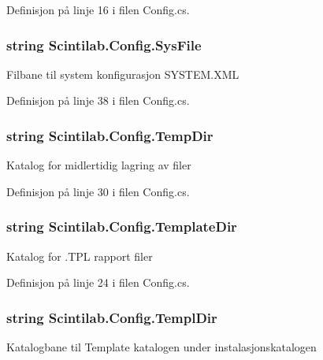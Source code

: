 Definisjon på linje 16 i filen Config.\+cs.

\hypertarget{class_scintilab_1_1_config_a08bd32b13d26a35e5888aa530b757fd8}{
\subsubsection[{Sys\+File}]{\setlength{\rightskip}{0pt plus 5cm}string Scintilab.\+Config.\+Sys\+File\hspace{0.3cm}{\ttfamily [static]}}}\label{class_scintilab_1_1_config_a08bd32b13d26a35e5888aa530b757fd8}
Filbane til system konfigurasjon S\+Y\+S\+T\+E\+M.\+X\+M\+L 

Definisjon på linje 38 i filen Config.\+cs.

\hypertarget{class_scintilab_1_1_config_a2cd246ee28cb2fbf3b3664e2de4e4a2f}{
\subsubsection[{Temp\+Dir}]{\setlength{\rightskip}{0pt plus 5cm}string Scintilab.\+Config.\+Temp\+Dir\hspace{0.3cm}{\ttfamily [static]}}}\label{class_scintilab_1_1_config_a2cd246ee28cb2fbf3b3664e2de4e4a2f}
Katalog for midlertidig lagring av filer 

Definisjon på linje 30 i filen Config.\+cs.

\hypertarget{class_scintilab_1_1_config_a281e06e21224c52ea875ca48a91285ac}{
\subsubsection[{Template\+Dir}]{\setlength{\rightskip}{0pt plus 5cm}string Scintilab.\+Config.\+Template\+Dir\hspace{0.3cm}{\ttfamily [static]}}}\label{class_scintilab_1_1_config_a281e06e21224c52ea875ca48a91285ac}
Katalog for .T\+P\+L rapport filer 

Definisjon på linje 24 i filen Config.\+cs.

\hypertarget{class_scintilab_1_1_config_ac4f5562af1d1a600b566d6c8b8e51d35}{
\subsubsection[{Templ\+Dir}]{\setlength{\rightskip}{0pt plus 5cm}string Scintilab.\+Config.\+Templ\+Dir\hspace{0.3cm}{\ttfamily [static]}}}\label{class_scintilab_1_1_config_ac4f5562af1d1a600b566d6c8b8e51d35}
Katalogbane til Template katalogen under instalasjonskatalogen 

